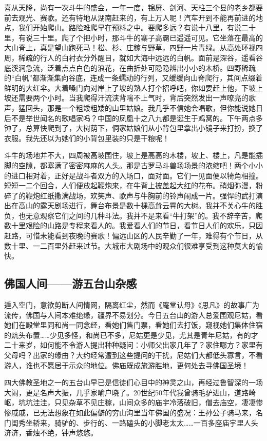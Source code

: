\documentclass{article}
\begin{document}
喜从天降，尚有一次斗牛的盛会，一年一度，锦屏、剑河、天柱三个县的老乡都要前去观光、赛歌。还有特地从湖南赶来的，有上万人呢！汽车开到不能再前进的地点，我们开始爬山。路险难爬早在预料之中。要爬多远？有说十八里，有说二十里，有说三十里。爬了个把小时，那斗牛的寨子高霸已遥遥可见。它坐落在最高的大山脊上，真是望山跑死马！松、杉、庄稼与野草，四野一片青绿。从高处环视四周，稀疏的行人的白衬衣分外醒目，就如大海中远远的白帆。面前是深谷，遥看谷底溪涧急流，泛着点点白色的浪花，在曲折处可隐隐辨出小小的木桥。四野稀疏的“白帆”都渐渐集向谷底，连成一条蠕动的行列，又缓缓向山脊爬行，其间点缀着鲜明的大红伞。大着嗓门向对岸上了坡的熟人打个招呼吧，你如要赶上他，下坡上坡还需要两个小时。当我爬得汗流浃背喘不上气时，背后突然发出一声嘹亮的歌声，猛回头，那是一个粗矮粗矮的山里姑娘。我几乎不信她会唱歌，但你能说她日后不是举世闻名的歌唱家吗？中国的凤凰十之八九都是诞生于鸡窝的。下午两点多钟了，总算快爬到了，大树荫下，侗家姑娘们从小背包里拿出小镜子来打扮，换了衣服。我先还以为她们的小背包里装的只是干粮呢！

斗牛的场地并不大，四周被高坡围住，坡上是高高的木楼，坡上、楼上，凡是能插脚的空隙，都塞满了密密麻麻的人头。那是古罗马斗兽场场景的浓缩吧！两个小小的进口相对着，正好是战斗者双方的入场口，面对面。它们一见面便以犄角相撞。短短一二个回合，人们便放起鞭炮来，在牛背上披盖起大红的花布。硝烟弥漫，粉碎了的鞭炮红纸撒满战场，欢笑声、歌声与牛胸前的铃声闹成一片。强悍的武打演出在高山的露天剧场进行，舞台布景是数十棵高耸云霄的大树。我并不关心牛的胜负，也无意观察它们之间的几种斗法。我并不是来看“牛打架”的。我不辞辛苦，爬数十里艰险的山路是专程来看人的。我爱看人们的节日，看节日人们的欢乐，只因赶路，可惜未能看到夜晚的赛歌！偏远山区的人民辛勤了一年，难得有个节日，从数十里、一二百里外赶来过节。大城市大剧场中的观众们很难享受到这种莫大的愉快。
\subsection{佛国人间——游五台山杂感}
遁入空门，意欲剪断人间情网，隔离红尘，然而《庵堂认母》《思凡》的故事广为流传，佛国与人间本难绝缘，疆界不易划分。今日五台山的游人总爱围观尼姑，看她们在殿堂里同和尚一同念经，看她们售门票，看她们去打饭，窥视她们集体住宿的炕头布置……少见多怪，和尚已不多，尼姑更是少见，尤其是青年尼姑，有的才二十来岁，如何能不令游人提出种种疑问：小师父出家几年了？家住哪方？家里有父母吗？出家的缘由？大约经常遭到这些提问的干扰，尼姑们大都低头寡言，不看游人，谁也不愿居于示众的地位。佛庙既成旅游胜地，更何处去寻佛国圣境！

四大佛教圣地之一的五台山早已是信徒们心目中的神灵之山，再经过鲁智深的一场大闹，更是名声大振，几乎家喻户晓了。20世纪50年代我曾骑毛驴进山，道路崎岖，坑坑洼洼，只见杂草不见庄稼，山间众多的庙宇冷落破旧，僧去庙空，凄凄惨惨戚戚，已无法想象在如此偏僻的穷山沟里当年佛国的盛况：王孙公子骑马来，名门闺秀坐轿来，骑驴的、步行的、一路磕头的小脚老太太……一百多座庙宇里人头济济，香烛不绝，钟声悠悠。
\end{document}
